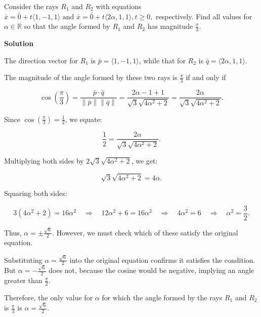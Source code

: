\begin{examplebox}
Consider the rays \( R_1 \) and \( R_2 \) with equations
\(
\bar{x} = \bar{0} + t\langle 1, -1, 1 \rangle \text{ and } \bar{x} = \bar{0} + t\langle 2\alpha, 1, 1 \rangle, t \geq 0,
\)
respectively. Find all values for \( \alpha \in \mathbb{R} \) so that the angle formed by \( R_1 \) and \( R_2 \) has magnitude \( \frac{\pi}{3} \).

\vspace{0.5em}
\textbf{Solution}

\vspace{0.5em}
The direction vector for \( R_1 \) is \( \bar{p} = \langle 1, -1, 1 \rangle \), while that for \( R_2 \) is \( \bar{q} = \langle 2\alpha, 1, 1 \rangle \).

The magnitude of the angle formed by these two rays is \( \frac{\pi}{3} \) if and only if


\[
\cos\left(\frac{\pi}{3}\right) = \frac{\bar{p} \cdot \bar{q}}{\|\bar{p}\| \|\bar{q}\|} = \frac{2\alpha - 1 + 1}{\sqrt{3} \sqrt{4\alpha^2 + 2}} = \frac{2\alpha}{\sqrt{3} \sqrt{4\alpha^2 + 2}}.
\]


Since \( \cos\left(\frac{\pi}{3}\right) = \frac{1}{2} \), we equate:


\[
\frac{1}{2} = \frac{2\alpha}{\sqrt{3} \sqrt{4\alpha^2 + 2}}.
\]


Multiplying both sides by \( 2\sqrt{3} \sqrt{4\alpha^2 + 2} \), we get:


\[
\sqrt{3} \sqrt{4\alpha^2 + 2} = 4\alpha.
\]


Squaring both sides:


\[
3(4\alpha^2 + 2) = 16\alpha^2 \quad \Rightarrow \quad 12\alpha^2 + 6 = 16\alpha^2 \quad \Rightarrow \quad 4\alpha^2 = 6 \quad \Rightarrow \quad \alpha^2 = \frac{3}{2}.
\]


Thus, \( \alpha = \pm \frac{\sqrt{6}}{2} \). However, we must check which of these satisfy the original equation.

Substituting \( \alpha = \frac{\sqrt{6}}{2} \) into the original equation confirms it satisfies the condition. But \( \alpha = -\frac{\sqrt{6}}{2} \) does not, because the cosine would be negative, implying an angle greater than \( \frac{\pi}{2} \).

Therefore, the only value for \( \alpha \) for which the angle formed by the rays \( R_1 \) and \( R_2 \) is \( \frac{\pi}{3} \) is
\(
\alpha = \frac{\sqrt{6}}{2}.
\)

\end{examplebox}

